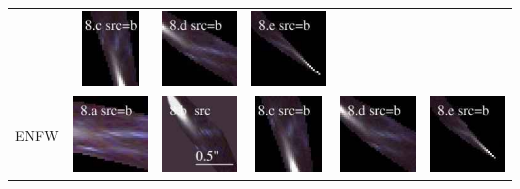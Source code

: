 \documentclass[useAMS,usenatbib]{mn2e}
\begin{document}
\begin{table}
\begin{tabular}{cccccc}
    & \multicolumn{1}{m{1.7cm}}{\includegraphics[height=2.00cm,clip]{figs/nsie_img/rgb.pre_8_c_b_tri.ps}}
    & \multicolumn{1}{m{1.7cm}}{\includegraphics[height=2.00cm,clip]{figs/nsie_img/rgb.pre_8_d_b_tri.ps}}
    & \multicolumn{1}{m{1.7cm}}{\includegraphics[height=2.00cm,clip]{figs/nsie_img/rgb.pre_8_e_b_tri.ps}} \\
    \multicolumn{1}{m{1cm}}{{\Large ENFW}}
    & \multicolumn{1}{m{1.7cm}}{\includegraphics[height=2.00cm,clip]{figs/enfw_img/rgb.pre_8_a_b_tri.ps}}
    & \multicolumn{1}{m{1.7cm}}{\includegraphics[height=2.00cm,clip]{figs/enfw_img/rgb.src_8_b.ps}}
    & \multicolumn{1}{m{1.7cm}}{\includegraphics[height=2.00cm,clip]{figs/enfw_img/rgb.pre_8_c_b_tri.ps}}
    & \multicolumn{1}{m{1.7cm}}{\includegraphics[height=2.00cm,clip]{figs/enfw_img/rgb.pre_8_d_b_tri.ps}}
    & \multicolumn{1}{m{1.7cm}}{\includegraphics[height=2.00cm,clip]{figs/enfw_img/rgb.pre_8_e_b_tri.ps}} \\
  \end{tabular}

\end{table}
\end{document}
